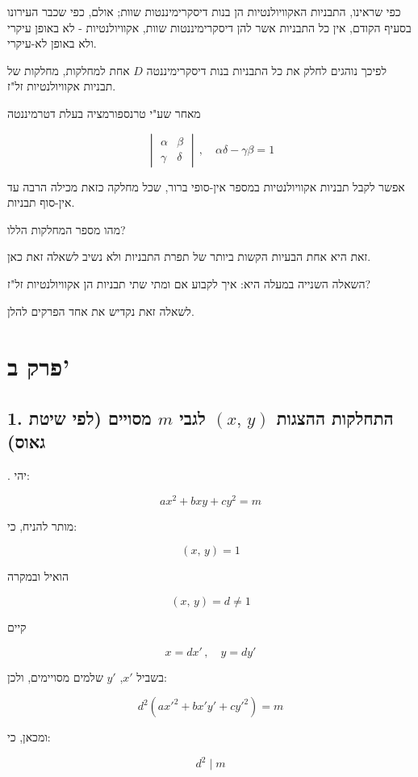 כפי שראינו, התבניות האקוויולנטיות הן בנות דיסקרימיננטות שוות; אולם, כפי שכבר העירונו בסעיף הקודם, אין כל התבניות אשר להן דיסקרימיננטות שוות, אקוויולנטיות - לא באופן עיקרי ולא באופן לא-עיקרי.

\medskip
לפיכך נוהגים לחלק את כל התבניות בנות דיסקרימיננטה $D$ אחת למחלקות, מחלקות של תבניות אקוויולנטיות זל"ז.

\medskip
מאחר שע"י טרנספורמציה בעלת דטרמיננטה

\[
\begin{vmatrix} \alpha & \beta \\ \gamma & \delta \end{vmatrix} \, , \quad \alpha\delta - \gamma\beta = 1
\]

אפשר לקבל תבניות אקוויולנטיות במספר אין-סופי ברור, שכל מחלקה כזאת מכילה הרבה עד אין-סוף תבניות.

\medskip
מהו מספר המחלקות הללו?

\medskip
זאת היא אחת הבעיות הקשות ביותר של תפרת התבניות ולא נשיב לשאלה זאת כאן.

\medskip
השאלה השנייה במעלה היא: איך לקבוע אם ומתי שתי תבניות הן אקוויולנטיות זל"ז?

\medskip
לשאלה זאת נקדיש את אחד הפרקים להלן.

\bigskip
\hrulefill

\section*{פרק ב'}

\subsection*{1. התחלקות ההצגות $(x,\,y)$ לגבי $m$ מסויים (לפי שיטת גאוס)}

. יהי:

\[ ax^2 + bxy + cy^2 = m \tag{1} \]

מותר להניח, כי:

\[ (x,\,y) = 1 \tag{2} \]

הואיל ובמקרה

\[ (x,\,y) = d \neq 1 \]

קיים

\[ x = dx' \, , \quad y = dy' \]

בשביל $x'$, $y'$ שלמים מסויימים, ולכן:

\[
d^2(ax'^2 + bx'y' + cy'^2) = m
\]

ומכאן, כי:

\[ d^2 \mid m \]


